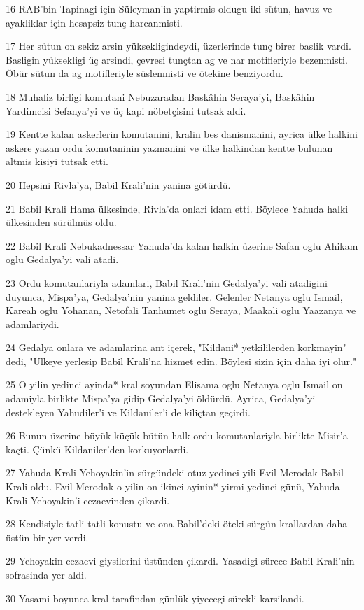\par 16 RAB'bin Tapinagi için Süleyman'in yaptirmis oldugu iki sütun, havuz ve ayakliklar için hesapsiz tunç harcanmisti.
\par 17 Her sütun on sekiz arsin yüksekligindeydi, üzerlerinde tunç birer baslik vardi. Basligin yüksekligi üç arsindi, çevresi tunçtan ag ve nar motifleriyle bezenmisti. Öbür sütun da ag motifleriyle süslenmisti ve ötekine benziyordu.
\par 18 Muhafiz birligi komutani Nebuzaradan Baskâhin Seraya'yi, Baskâhin Yardimcisi Sefanya'yi ve üç kapi nöbetçisini tutsak aldi.
\par 19 Kentte kalan askerlerin komutanini, kralin bes danismanini, ayrica ülke halkini askere yazan ordu komutaninin yazmanini ve ülke halkindan kentte bulunan altmis kisiyi tutsak etti.
\par 20 Hepsini Rivla'ya, Babil Krali'nin yanina götürdü.
\par 21 Babil Krali Hama ülkesinde, Rivla'da onlari idam etti. Böylece Yahuda halki ülkesinden sürülmüs oldu.
\par 22 Babil Krali Nebukadnessar Yahuda'da kalan halkin üzerine Safan oglu Ahikam oglu Gedalya'yi vali atadi.
\par 23 Ordu komutanlariyla adamlari, Babil Krali'nin Gedalya'yi vali atadigini duyunca, Mispa'ya, Gedalya'nin yanina geldiler. Gelenler Netanya oglu Ismail, Kareah oglu Yohanan, Netofali Tanhumet oglu Seraya, Maakali oglu Yaazanya ve adamlariydi.
\par 24 Gedalya onlara ve adamlarina ant içerek, "Kildani* yetkililerden korkmayin" dedi, "Ülkeye yerlesip Babil Krali'na hizmet edin. Böylesi sizin için daha iyi olur."
\par 25 O yilin yedinci ayinda* kral soyundan Elisama oglu Netanya oglu Ismail on adamiyla birlikte Mispa'ya gidip Gedalya'yi öldürdü. Ayrica, Gedalya'yi destekleyen Yahudiler'i ve Kildaniler'i de kiliçtan geçirdi.
\par 26 Bunun üzerine büyük küçük bütün halk ordu komutanlariyla birlikte Misir'a kaçti. Çünkü Kildaniler'den korkuyorlardi.
\par 27 Yahuda Krali Yehoyakin'in sürgündeki otuz yedinci yili Evil-Merodak Babil Krali oldu. Evil-Merodak o yilin on ikinci ayinin* yirmi yedinci günü, Yahuda Krali Yehoyakin'i cezaevinden çikardi.
\par 28 Kendisiyle tatli tatli konustu ve ona Babil'deki öteki sürgün krallardan daha üstün bir yer verdi.
\par 29 Yehoyakin cezaevi giysilerini üstünden çikardi. Yasadigi sürece Babil Krali'nin sofrasinda yer aldi.
\par 30 Yasami boyunca kral tarafindan günlük yiyecegi sürekli karsilandi.


